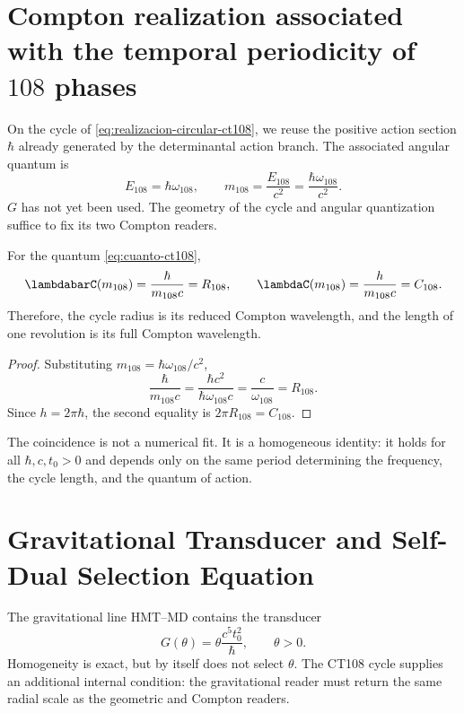 \label{chap:planck-autodual}

\section{Compton realization associated with the temporal periodicity of \(108\) phases}

On the cycle of \cref{eq:realizacion-circular-ct108}, we reuse the positive action
section \(\hbar\) already generated by the determinantal action branch.
The associated angular quantum is
\begin{equation}
E_{108}=\hbar\omega_{108},
\qquad
m_{108}=\frac{E_{108}}{c^2}
=\frac{\hbar\omega_{108}}{c^2}.
\label{eq:cuanto-ct108}
\end{equation}
\(G\) has not yet been used. The geometry of the cycle and angular
quantization suffice to fix its two Compton readers.

\begin{theorem}
\label{thm:ct108-compton}
For the quantum \eqref{eq:cuanto-ct108},
\begin{equation}
\lambdabarC(m_{108})=\frac{\hbar}{m_{108}c}=R_{108},
\qquad
\lambdaC(m_{108})=\frac{h}{m_{108}c}=C_{108}.
\label{eq:identidad-ct108-compton}
\end{equation}
Therefore, the cycle radius is its reduced Compton wavelength, and the
length of one revolution is its full Compton wavelength.
\end{theorem}

\begin{proof}
Substituting \(m_{108}=\hbar\omega_{108}/c^2\),
\[
\frac{\hbar}{m_{108}c}
=\frac{\hbar c^2}{\hbar\omega_{108}c}
=\frac{c}{\omega_{108}}=R_{108}.
\]
Since \(h=2\pi\hbar\), the second equality is \(2\pi R_{108}=C_{108}\).
\end{proof}

The coincidence is not a numerical fit. It is a homogeneous identity: it holds
for all \(\hbar,c,t_0>0\) and depends only on the same period determining
the frequency, the cycle length, and the quantum of action.

\section{Gravitational Transducer and Self-Dual Selection Equation}

The gravitational line HMT--MD contains the transducer
\begin{equation}
G(\theta)=\theta\frac{c^5t_0^2}{\hbar},
\qquad \theta>0.
\label{eq:transductor-g-planck-anexo}
\end{equation}
Homogeneity is exact, but by itself does not select \(\theta\). The
CT108 cycle supplies an additional internal condition: the gravitational reader
must return the same radial scale as the geometric and Compton
readers.

